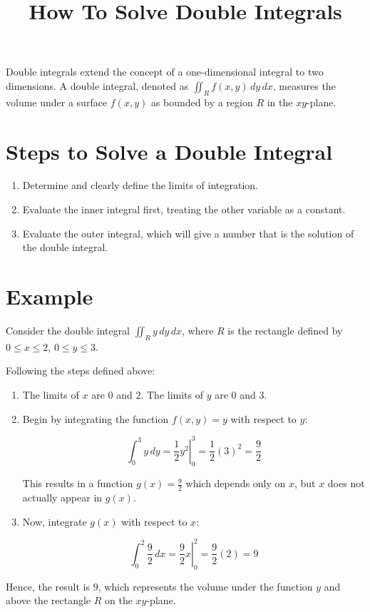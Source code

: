 \documentclass{article}
\begin{document}
\title{How To Solve Double Integrals}
\author{}
\date{}
\maketitle

Double integrals extend the concept of a one-dimensional integral to two dimensions. A double integral, denoted as $\iint_R f(x, y) \,dy\,dx$, measures the volume under a surface $f(x, y)$ as bounded by a region $R$ in the $xy$-plane.

\section{Steps to Solve a Double Integral}

\begin{enumerate}
    \item Determine and clearly define the limits of integration. 
    \item Evaluate the inner integral first, treating the other variable as a constant.
    \item Evaluate the outer integral, which will give a number that is the solution of the double integral.
\end{enumerate}

\section{Example}

Consider the double integral $\iint_R y\,dy\,dx$, where $R$ is the rectangle defined by $0 \leq x \leq 2$, $0 \leq y \leq 3$.

Following the steps defined above:

\begin{enumerate}
    \item The limits of $x$ are $0$ and $2$. The limits of $y$ are $0$ and $3$.
    \item Begin by integrating the function $f(x,y)=y$ with respect to $y$:

    \begin{equation*}
        \int_{0}^{3} y\,dy = \left. \frac{1}{2} y^2 \right|_{0}^{3} = \frac{1}{2} (3)^2 = \frac{9}{2}
    \end{equation*}

    This results in a function $g(x)=\frac{9}{2}$ which depends only on $x$, but $x$ does not actually appear in $g(x)$.
    \item Now, integrate $g(x)$ with respect to $x$:

    \begin{equation*}
        \int_{0}^{2} \frac{9}{2}\,dx = \left. \frac{9}{2} x \right|_{0}^{2} = \frac{9}{2} (2) = 9
    \end{equation*}
\end{enumerate}

Hence, the result is $9$, which represents the volume under the function $y$ and above the rectangle $R$ on the $xy$-plane.
\end{document}
